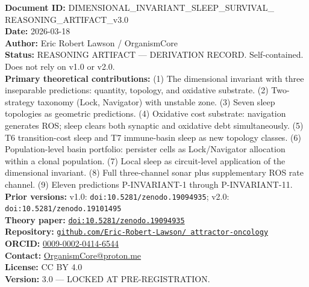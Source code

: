 \documentclass[10pt, a4paper]{article}
\begin{document}
{\footnotesize
\textbf{Document ID:}
DIMENSIONAL\_INVARIANT\_SLEEP\_SURVIVAL\_
REASONING\_ARTIFACT\_v3.0\\
\textbf{Date:} 2026-03-18\\
\textbf{Author:} Eric Robert Lawson /
OrganismCore\\
\textbf{Status:} REASONING ARTIFACT ---
DERIVATION RECORD. Self-contained.
Does not rely on v1.0 or v2.0.\\
\textbf{Primary theoretical contributions:}
(1) The dimensional invariant with three
inseparable predictions: quantity, topology,
and oxidative substrate.
(2) Two-strategy taxonomy (Lock, Navigator)
with unstable zone.
(3) Seven sleep topologies as geometric
predictions.
(4) Oxidative cost substrate: navigation
generates ROS; sleep clears both synaptic
and oxidative debt simultaneously.
(5) T6 transition-cost sleep and T7
immune-basin sleep as new topology
classes.
(6) Population-level basin portfolio:
persister cells as Lock/Navigator
allocation within a clonal population.
(7) Local sleep as circuit-level
application of the dimensional invariant.
(8) Full three-channel sonar plus
supplementary ROS rate channel.
(9) Eleven predictions
P-INVARIANT-1 through P-INVARIANT-11.\\
\textbf{Prior versions:}
v1.0: \texttt{doi:10.5281/zenodo.19094935};
v2.0: \texttt{doi:10.5281/zenodo.19101495}\\
\textbf{Theory paper:}
\href{https://doi.org/10.5281/zenodo.19094935}
{\texttt{doi:10.5281/zenodo.19094935}}\\
\textbf{Repository:}
\href{https://github.com/Eric-Robert-Lawson/
attractor-oncology}
{\texttt{github.com/Eric-Robert-Lawson/
attractor-oncology}}\\
\textbf{ORCID:}
\href{https://orcid.org/0009-0002-0414-6544}
{0009-0002-0414-6544}\\
\textbf{Contact:}
\href{mailto:OrganismCore@proton.me}
{OrganismCore@proton.me}\\
\textbf{License:} CC BY 4.0\\
\textbf{Version:} 3.0 --- LOCKED AT
PRE-REGISTRATION.
}
\end{document}
